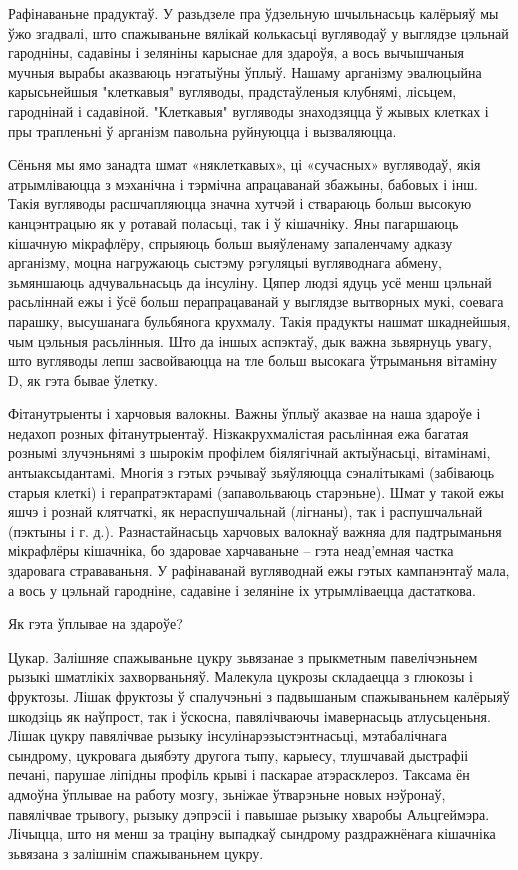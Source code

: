Рафінаваньне прадуктаў.
У разьдзеле пра ўдзельную шчыльнасьць калёрыяў мы ўжо згадвалі, што спажываньне вялікай колькасьці вугляводаў у выглядзе цэльнай гародніны, садавіны і зеляніны карыснае для здароўя, а вось вычышчаныя мучныя вырабы аказваюць нэгатыўны ўплыў. Нашаму арганізму эвалюцыйна карысьнейшыя "клеткавыя" вугляводы, прадстаўленыя клубнямі, лісьцем, гароднінай і садавіной. "Клеткавыя" вугляводы знаходзяцца ў жывых клетках і пры трапленьні ў арганізм павольна руйнуюцца і вызваляюцца.

Сёньня мы ямо занадта шмат «няклеткавых», ці «сучасных» вугляводаў, якія атрымліваюцца з мэханічна і тэрмічна апрацаванай збажыны, бабовых і інш. Такія вугляводы расшчапляюцца значна хутчэй і ствараюць больш высокую канцэнтрацыю як у ротавай поласьці, так і ў кішачніку. Яны пагаршаюць кішачную мікрафлёру, спрыяюць больш выяўленаму запаленчаму адказу арганізму, моцна нагружаюць сыстэму рэгуляцыі вугляводнага абмену, зьмяншаюць адчувальнасьць да інсуліну. Цяпер людзі ядуць усё менш цэльнай расьліннай ежы і ўсё больш перапрацаванай у выглядзе вытворных мукі, соевага парашку, высушанага бульбянога крухмалу. Такія прадукты нашмат шкаднейшыя, чым цэльныя расьлінныя. Што да іншых аспэктаў, дык важна зьвярнуць увагу, што вугляводы лепш засвойваюцца на тле больш высокага ўтрыманьня вітаміну D, як гэта бывае ўлетку.

Фітанутрыенты і харчовыя валокны.
Важны ўплыў аказвае на наша здароўе і недахоп розных фітанутрыентаў. Нізкакрухмалістая расьлінная ежа багатая рознымі злучэньнямі з шырокім профілем біялягічнай актыўнасьці, вітамінамі, антыаксыдантамі. Многія з гэтых рэчываў зьяўляюцца сэналітыкамі (забіваюць старыя клеткі) і герапратэктарамі (запавольваюць старэньне).
Шмат у такой ежы яшчэ і рознай клятчаткі, як нераспушчальнай (лігнаны), так і распушчальнай (пэктыны і г. д.). Разнастайнасьць харчовых валокнаў важняа для падтрыманьня мікрафлёры кішачніка, бо здаровае харчаваньне – гэта неад'емная частка здаровага страваваньня. У рафінаванай вугляводнай ежы гэтых кампанэнтаў мала, а вось у цэльнай гародніне, садавіне і зеляніне іх утрымліваецца дастаткова.

Як гэта ўплывае на здароўе?

Цукар.
Залішняе спажываньне цукру зьвязанае з прыкметным павелічэньнем рызыкі шматлікіх захворваньняў. Малекула цукрозы складаецца з глюкозы і фруктозы. Лішак фруктозы ў спалучэньні з падвышаным спажываньнем калёрыяў шкодзіць як наўпрост, так і ўскосна, павялічваючы імавернасьць атлусьценьня. Лішак цукру павялічвае рызыку інсулінарэзыстэнтнасьці, мэтабалічнага сындрому, цукровага дыябэту другога тыпу, карыесу, тлушчавай дыстрафіі печані, парушае ліпідны профіль крыві і паскарае атэрасклероз. Таксама ён адмоўна ўплывае на работу мозгу, зьніжае ўтварэньне новых нэўронаў, павялічвае трывогу, рызыку дэпрэсіі і павышае рызыку хваробы Альцгеймэра. Лічыцца, што ня менш за траціну выпадкаў сындрому раздражнёнага кішачніка зьвязана з залішнім спажываньнем цукру.

